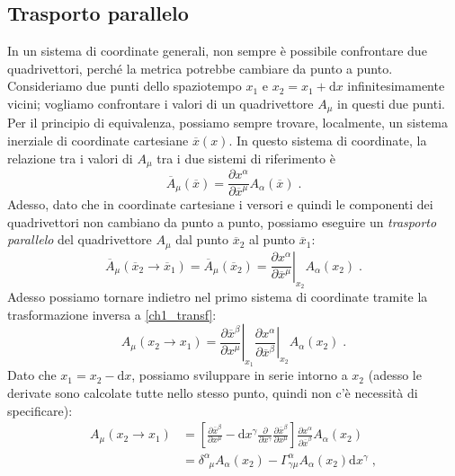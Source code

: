 \documentclass[12pt,a4paper]{report}
\theoremstyle{definition}
\newcommand{\diff}[1][]{\mathrm{d}#1}
\begin{document}
\subsection{Trasporto parallelo}
In un sistema di coordinate generali, non sempre è possibile confrontare due quadrivettori, perché la metrica potrebbe cambiare da punto a punto. Consideriamo due punti dello spaziotempo $x_1$ e $x_2=x_1+\diff{x}$ infinitesimamente vicini; vogliamo confrontare i valori di un quadrivettore $A_{\mu}$ in questi due punti. Per il principio di equivalenza, possiamo sempre trovare, localmente, un sistema inerziale di coordinate cartesiane $\overline{x}(x)$. In questo sistema di coordinate, la relazione tra i valori di $A_{\mu}$ tra i due sistemi di riferimento è
\begin{equation}
\overline{A}_{\mu}(\overline{x})=\frac{\partial x^{\alpha}}{\partial \overline{x}^{\mu}}A_{\alpha}(\overline{x})\;. \label{ch1_transf}
\end{equation}
Adesso, dato che in coordinate cartesiane i versori e quindi le componenti dei quadrivettori non cambiano da punto a punto, possiamo eseguire un \emph{trasporto parallelo} del quadrivettore $A_{\mu}$ dal punto $\overline{x}_2$ al punto $\overline{x}_1$:
\begin{equation}
\overline{A}_{\mu}(\overline{x}_2\to\overline{x}_1)=\overline{A}_{\mu}(\overline{x}_2)=\left.\frac{\partial x^{\alpha}}{\partial \overline{x}^{\mu}}\right|_{x_2}A_{\alpha}(x_2)\;.
\end{equation}
Adesso possiamo tornare indietro nel primo sistema di coordinate tramite la trasformazione inversa a \eqref{ch1_transf}:
\begin{equation}
A_{\mu}(x_2\to x_1)=\left.\frac{\partial\overline{x}^{\beta}}{\partial x^{\mu}}\right|_{x_1}\left.\frac{\partial x^{\alpha}}{\partial\overline{x}^{\beta}}\right|_{x_2}A_{\alpha}(x_2)\;.
\end{equation}
Dato che $x_1=x_2-\diff{x}$, possiamo sviluppare in serie intorno a $x_2$ (adesso le derivate sono calcolate tutte nello stesso punto, quindi non c'è necessità di specificare):
\begin{align*}
A_{\mu}(x_2\to x_1)&=\left[\frac{\partial\overline{x}^{\beta}}{\partial x^{\mu}}-\diff{x^{\gamma}}\frac{\partial}{\partial x^{\gamma}}\frac{\partial\overline{x}^{\beta}}{\partial x^{\mu}}\right]\frac{\partial x^{\alpha}}{\partial \overline{x}^{\beta}}A_{\alpha}(x_2)  \\
&= \delta^{\alpha}_{\;\;\mu}A_{\alpha}(x_2)-\Gamma^{\alpha}_{\gamma\mu}A_{\alpha}(x_2)\diff{x^{\gamma}}\;,
\end{align*}
\end{document}
